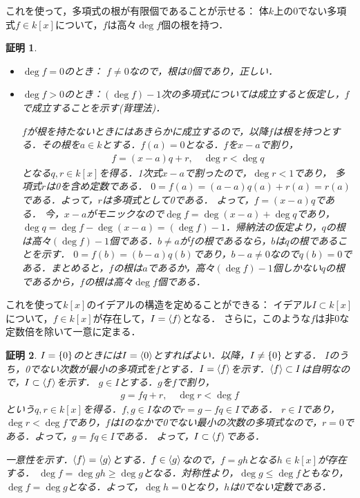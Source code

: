 \documentclass[9pt]{ltjsarticle}
\theoremstyle{break}
\theoremstyle{break}
\theoremstyle{break}
\theoremstyle{break}
\theoremstyle{break}
\theoremstyle{break}
\theoremstyle{break}
\theoremstyle{break}
\theoremstyle{break}
\theoremstyle{break}
\theoremstyle{break}
\theoremstyle{break}
\theoremstyle{break}
\theoremstyle{break}
\theoremstyle{break}
\theoremstyle{nonumberbreak}
\newtheorem{myproof}{証明}
\theoremstyle{nonumberbreak}
\begin{document}
これを使って，多項式の根が有限個であることが示せる：
体$k$上の0でない多項式$f\in k[x]$について，$f$は高々$\deg f$個の根を持つ．
\begin{myproof}
 \begin{itemize}
  \item $\deg f = 0$のとき：
$f\neq 0$なので，根は0個であり，正しい．
  \item $\deg f > 0$のとき：$(\deg f) -1$次の多項式については成立すると仮定し，$f$で成立することを示す(背理法)．

$f$が根を持たないときにはあきらかに成立するので，以降$f$は根を持つとする．その根を$a \in k$とする．$f(a)=0$となる．$f$を$x-a$で割り，
\begin{align}
 f = (x-a)q +r ,\quad \deg r < \deg q
\end{align}
となる$q,r\in k[x]$を得る．1次式$x-a$で割ったので，$\deg r < 1$であり，
多項式$r$は0を含め定数である．
$0=f(a)=(a-a)q(a) + r(a) = r(a)$である．よって，$r$は多項式として0である．
よって，$f=(x-a)q$である．
今，$x-a$がモニックなので$\deg f = \deg (x-a) + \deg q$であり，$\deg q = \deg f - \deg (x-a) = (\deg f) - 1$．帰納法の仮定より，$q$の根は高々$(\deg f)-1$個である．$b\neq a$が$f$の根であるなら，$b$は$q$の根であることを示す．
$0=f(b)=(b-a)q(b)$であり，$b-a\neq 0$なので$q(b)=0$である．まとめると，$f$の根は$a$であるか，高々$(\deg f)-1$個しかない$q$の根であるから，$f$の根は高々$\deg f$個である．
 \end{itemize}

\end{myproof}

これを使って$k[x]$のイデアルの構造を定めることができる：
イデアル$I\subset k[x]$について，$f\in k[x]$が存在して，$I = \langle f \rangle$となる．
さらに，このような$f$は非0な定数倍を除いて一意に定まる．
\begin{myproof}
 $I=\{0\}$のときには$I=\langle 0 \rangle$とすればよい．以降，$I\neq \{0\}$とする．
$I$のうち，0でない次数が最小の多項式を$f$とする．$I = \langle f \rangle$を示す．$\langle f \rangle \subset I$は自明なので，$I\subset \langle f \rangle$を示す．
$g\in I$とする．$g$を$f$で割り，
\begin{align}
 g = fq + r,\quad \deg r < \deg f
\end{align}
という$q,r\in k[x]$を得る．$f,g\in I$なので$r = g-fq \in I$である．
$r\in I$であり，$\deg r < \deg f$であり，$f$は$I$のなかで0でない最小の次数の多項式なので，$r = 0$である．よって，$g=fq \in I$である．
よって，$I\subset \langle f \rangle$である．

一意性を示す．$\langle f \rangle=\langle g \rangle$とする．$f\in \langle g \rangle$なので，$f=gh$となる$h\in k[x]$が存在する．
$\deg f = \deg gh \ge \deg g$となる．対称性より，$\deg g \le \deg f$ともなり，$\deg f = \deg g$となる．よって，$\deg h = 0$となり，$h$は0でない定数である．
\end{myproof}
\end{document}
